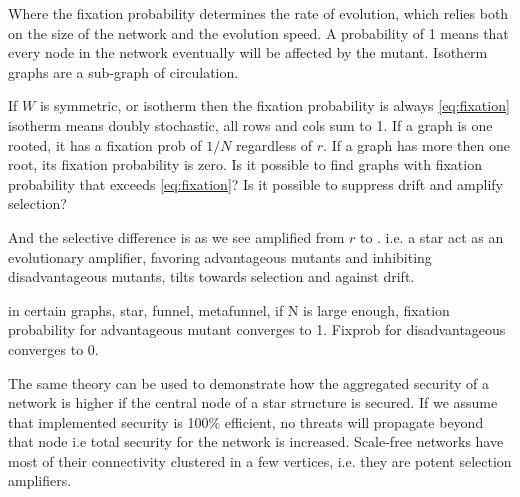 Where the fixation probability determines the rate of evolution, which relies both on the size of the network and the evolution speed. A probability of 1 means that every node in the network eventually will be affected by the mutant.   
Isotherm graphs are a sub-graph of circulation. 

If $W$ is symmetric, or isotherm then the fixation probability is always \ref{eq:fixation}
isotherm means doubly stochastic, all rows and cols sum to 1. 
If a graph is one rooted, it has a fixation prob of $1/N$ regardless of $r$. If a graph has more then one root, its fixation probability is zero. 
Is it possible to find graphs with fixation probability that exceeds \ref{eq:fixation}? Is it possible to suppress drift and amplify selection?

And the selective difference is as we see amplified from $r$ to . i.e. a star act as an evolutionary amplifier,
 favoring advantageous mutants and inhibiting disadvantageous mutants, tilts towards selection and against drift.
 
 
 in certain graphs, star, funnel, metafunnel, if N is large enough, fixation probability for advantageous mutant converges to 1. Fixprob for disadvantageous converges to 0.
 
 
The same theory can be used to demonstrate how the aggregated security of a network is higher if the central node of a star structure is secured. 
If we assume that implemented security is 100$\%$ efficient, no threats will propagate beyond that node i.e total security for the network is increased. 
Scale-free networks have most of their connectivity clustered in a few vertices, i.e. they are potent selection amplifiers.